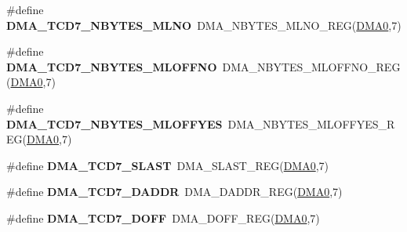 \begin{DoxyCompactItemize}
\item 
\#define {\bfseries D\+M\+A\+\_\+\+T\+C\+D7\+\_\+\+N\+B\+Y\+T\+E\+S\+\_\+\+M\+L\+NO}~D\+M\+A\+\_\+\+N\+B\+Y\+T\+E\+S\+\_\+\+M\+L\+N\+O\+\_\+\+R\+EG(\hyperlink{group__DMA__Peripheral__Access__Layer_ga4103044f9ca209772f513dc694513ffb}{D\+M\+A0},7)\hypertarget{group__DMA__Register__Accessor__Macros_ga110b7288144f75de7dc00a04c099653f}{}\label{group__DMA__Register__Accessor__Macros_ga110b7288144f75de7dc00a04c099653f}

\item 
\#define {\bfseries D\+M\+A\+\_\+\+T\+C\+D7\+\_\+\+N\+B\+Y\+T\+E\+S\+\_\+\+M\+L\+O\+F\+F\+NO}~D\+M\+A\+\_\+\+N\+B\+Y\+T\+E\+S\+\_\+\+M\+L\+O\+F\+F\+N\+O\+\_\+\+R\+EG(\hyperlink{group__DMA__Peripheral__Access__Layer_ga4103044f9ca209772f513dc694513ffb}{D\+M\+A0},7)\hypertarget{group__DMA__Register__Accessor__Macros_ga6dea6a9aae6fc4c980f6f7a3809c93db}{}\label{group__DMA__Register__Accessor__Macros_ga6dea6a9aae6fc4c980f6f7a3809c93db}

\item 
\#define {\bfseries D\+M\+A\+\_\+\+T\+C\+D7\+\_\+\+N\+B\+Y\+T\+E\+S\+\_\+\+M\+L\+O\+F\+F\+Y\+ES}~D\+M\+A\+\_\+\+N\+B\+Y\+T\+E\+S\+\_\+\+M\+L\+O\+F\+F\+Y\+E\+S\+\_\+\+R\+EG(\hyperlink{group__DMA__Peripheral__Access__Layer_ga4103044f9ca209772f513dc694513ffb}{D\+M\+A0},7)\hypertarget{group__DMA__Register__Accessor__Macros_ga081d406e1d570ce8c4a6c977e00d0201}{}\label{group__DMA__Register__Accessor__Macros_ga081d406e1d570ce8c4a6c977e00d0201}

\item 
\#define {\bfseries D\+M\+A\+\_\+\+T\+C\+D7\+\_\+\+S\+L\+A\+ST}~D\+M\+A\+\_\+\+S\+L\+A\+S\+T\+\_\+\+R\+EG(\hyperlink{group__DMA__Peripheral__Access__Layer_ga4103044f9ca209772f513dc694513ffb}{D\+M\+A0},7)\hypertarget{group__DMA__Register__Accessor__Macros_ga5c071968c6d2421889098ea4f55c68e0}{}\label{group__DMA__Register__Accessor__Macros_ga5c071968c6d2421889098ea4f55c68e0}

\item 
\#define {\bfseries D\+M\+A\+\_\+\+T\+C\+D7\+\_\+\+D\+A\+D\+DR}~D\+M\+A\+\_\+\+D\+A\+D\+D\+R\+\_\+\+R\+EG(\hyperlink{group__DMA__Peripheral__Access__Layer_ga4103044f9ca209772f513dc694513ffb}{D\+M\+A0},7)\hypertarget{group__DMA__Register__Accessor__Macros_ga1a521a7dfdbf6626ffcaaccaca1eed27}{}\label{group__DMA__Register__Accessor__Macros_ga1a521a7dfdbf6626ffcaaccaca1eed27}

\item 
\#define {\bfseries D\+M\+A\+\_\+\+T\+C\+D7\+\_\+\+D\+O\+FF}~D\+M\+A\+\_\+\+D\+O\+F\+F\+\_\+\+R\+EG(\hyperlink{group__DMA__Peripheral__Access__Layer_ga4103044f9ca209772f513dc694513ffb}{D\+M\+A0},7)\hypertarget{group__DMA__Register__Accessor__Macros_ga51be79805d416f10b5705f324a660b5c}{}\label{group__DMA__Register__Accessor__Macros_ga51be79805d416f10b5705f324a660b5c}


\end{DoxyCompactItemize}
